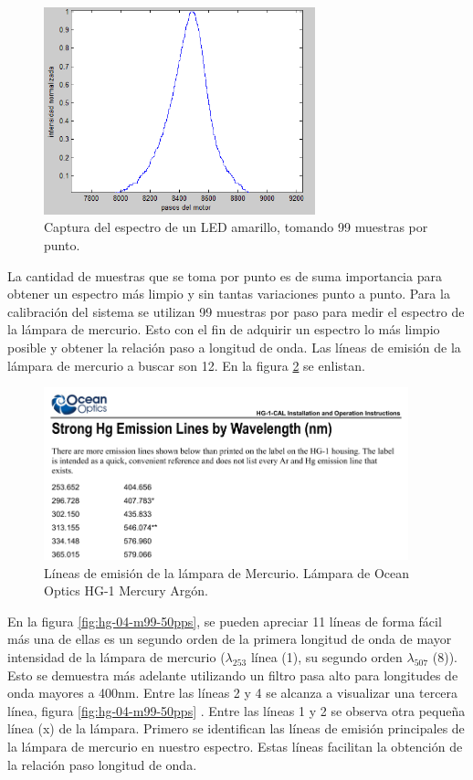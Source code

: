 \begin{figure}[h]
	\centering
	\includegraphics[width=0.9\linewidth,height=6cm]{Imagenes/3/LED99Muestras}
	\caption[Espectro de un LED amarillo.]{Captura del espectro de un LED amarillo, tomando 99 muestras por punto.}
	\label{fig:led99muestras}
\end{figure}

La cantidad de muestras que se toma por punto es de suma importancia para obtener un espectro más limpio y sin tantas variaciones punto a punto.
Para la calibración del sistema se utilizan 99 muestras por paso para medir el espectro de la lámpara de mercurio. Esto con el fin de adquirir un espectro lo más limpio posible y obtener la relación paso a longitud de onda. Las líneas de emisión de la lámpara de mercurio a buscar son 12. En la figura \ref{fig:mercuriolineas} se enlistan.

\begin{figure}[h]
	\centering
	\includegraphics[width=0.8\linewidth,height=5cm]{Imagenes/3/Mercuriolineas}
	\caption{Líneas de emisión de la lámpara de Mercurio. Lámpara de Ocean Optics HG-1 Mercury Argón. \cite{Excel2000}}
	\label{fig:mercuriolineas}
\end{figure}

En la figura \ref{fig:hg-04-m99-50pps}, se pueden apreciar 11 líneas de forma fácil más una de ellas es un segundo orden de la primera longitud de onda de mayor intensidad de la lámpara de mercurio ($\lambda_{253}$ línea (1), su segundo orden $\lambda_{507}$ (8)). Esto se demuestra más adelante utilizando un filtro pasa alto para longitudes de onda mayores a 400nm. Entre las líneas 2 y 4 se alcanza a visualizar una tercera línea, figura \ref{fig:hg-04-m99-50pps} . Entre las líneas 1 y 2 se observa otra pequeña línea (x) de la lámpara. Primero se identifican las líneas de emisión principales de la lámpara de mercurio en nuestro espectro. Estas líneas facilitan la obtención de la relación paso longitud de onda.

